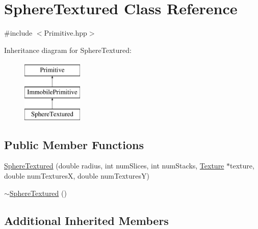 \hypertarget{class_sphere_textured}{\section{Sphere\-Textured Class Reference}
\label{class_sphere_textured}
}


{\ttfamily \#include $<$Primitive.\-hpp$>$}

Inheritance diagram for Sphere\-Textured\-:\begin{figure}[H]
\begin{center}
\leavevmode
\includegraphics[height=3.000000cm]{class_sphere_textured}
\end{center}
\end{figure}
\subsection*{Public Member Functions}
\begin{DoxyCompactItemize}
\item 
\hyperlink{class_sphere_textured_a4f74ca17aac4c4e79714fad43c2baa2a}{Sphere\-Textured} (double radius, int num\-Slices, int num\-Stacks, \hyperlink{class_texture}{Texture} $\ast$texture, double num\-Textures\-X, double num\-Textures\-Y)
\item 
\hyperlink{class_sphere_textured_a5eb156e3eb2607d203067c67c26b8fe9}{$\sim$\-Sphere\-Textured} ()
\end{DoxyCompactItemize}
\subsection*{Additional Inherited Members}


